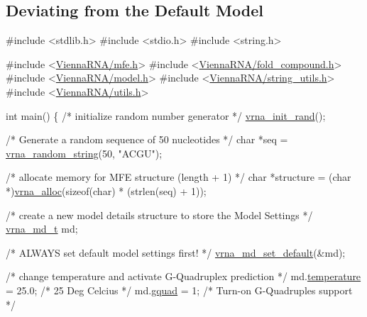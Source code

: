 \subsection*{Deviating from the Default Model }


\begin{DoxyCodeInclude}
\textcolor{preprocessor}{#include <stdlib.h>}
\textcolor{preprocessor}{#include <stdio.h>}
\textcolor{preprocessor}{#include <string.h>}

\textcolor{preprocessor}{#include <\mbox{\hyperlink{mfe_8h}{ViennaRNA/mfe.h}}>}
\textcolor{preprocessor}{#include <\mbox{\hyperlink{fold__compound_8h}{ViennaRNA/fold\_compound.h}}>}
\textcolor{preprocessor}{#include <\mbox{\hyperlink{model_8h}{ViennaRNA/model.h}}>}
\textcolor{preprocessor}{#include <\mbox{\hyperlink{string__utils_8h}{ViennaRNA/string\_utils.h}}>}
\textcolor{preprocessor}{#include <\mbox{\hyperlink{utils_8h}{ViennaRNA/utils.h}}>}

\textcolor{keywordtype}{int}
main()
\{
  \textcolor{comment}{/* initialize random number generator */}
  \mbox{\hyperlink{group__utils_ga0ad1f40ea316e5c5918695c35613027a}{vrna\_init\_rand}}();

  \textcolor{comment}{/* Generate a random sequence of 50 nucleotides */}
  \textcolor{keywordtype}{char}      *seq = \mbox{\hyperlink{group__string__utils_ga4eeb3750dcf860b9f3158249f95dbd7f}{vrna\_random\_string}}(50, \textcolor{stringliteral}{"ACGU"});

  \textcolor{comment}{/* allocate memory for MFE structure (length + 1) */}
  \textcolor{keywordtype}{char}      *structure = (\textcolor{keywordtype}{char} *)\mbox{\hyperlink{group__utils_gaf37a0979367c977edfb9da6614eebe99}{vrna\_alloc}}(\textcolor{keyword}{sizeof}(\textcolor{keywordtype}{char}) * (strlen(seq) + 1));

  \textcolor{comment}{/* create a new model details structure to store the Model Settings */}
  \mbox{\hyperlink{group__model__details_structvrna__md__s}{vrna\_md\_t}} md;

  \textcolor{comment}{/* ALWAYS set default model settings first! */}
  \mbox{\hyperlink{group__model__details_ga8ac6ff84936282436f822644bf841f66}{vrna\_md\_set\_default}}(&md);

  \textcolor{comment}{/* change temperature and activate G-Quadruplex prediction */}
  md.\mbox{\hyperlink{group__model__details_a5f7e5c2b65bada5188443470e576aa4b}{temperature}}  = 25.0; \textcolor{comment}{/* 25 Deg Celcius */}
  md.\mbox{\hyperlink{group__model__details_af88a511a2b1f526b4c6213de6cb8fd6e}{gquad}}        = 1;    \textcolor{comment}{/* Turn-on G-Quadruples support */}


\end{DoxyCodeInclude}
